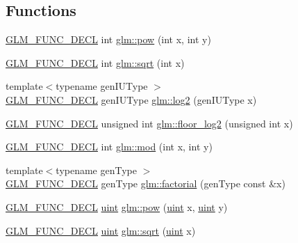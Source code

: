 \subsection*{Functions}
\begin{DoxyCompactItemize}
\item 
\hyperlink{setup_8hpp_ab2d052de21a70539923e9bcbf6e83a51}{G\+L\+M\+\_\+\+F\+U\+N\+C\+\_\+\+D\+E\+CL} int \hyperlink{group__gtx__integer_ga9642514a44a67afa70966d756f040ca9}{glm\+::pow} (int x, int y)
\item 
\hyperlink{setup_8hpp_ab2d052de21a70539923e9bcbf6e83a51}{G\+L\+M\+\_\+\+F\+U\+N\+C\+\_\+\+D\+E\+CL} int \hyperlink{group__gtx__integer_ga78e2e68330e91d350fcfc2f4831cad12}{glm\+::sqrt} (int x)
\item 
{\footnotesize template$<$typename gen\+I\+U\+Type $>$ }\\\hyperlink{setup_8hpp_ab2d052de21a70539923e9bcbf6e83a51}{G\+L\+M\+\_\+\+F\+U\+N\+C\+\_\+\+D\+E\+CL} gen\+I\+U\+Type \hyperlink{group__gtx__integer_ga9bd682e74bfacb005c735305207ec417}{glm\+::log2} (gen\+I\+U\+Type x)
\item 
\hyperlink{setup_8hpp_ab2d052de21a70539923e9bcbf6e83a51}{G\+L\+M\+\_\+\+F\+U\+N\+C\+\_\+\+D\+E\+CL} unsigned int \hyperlink{group__gtx__integer_ga7011b4e1c1e1ed492149b028feacc00e}{glm\+::floor\+\_\+log2} (unsigned int x)
\item 
\hyperlink{setup_8hpp_ab2d052de21a70539923e9bcbf6e83a51}{G\+L\+M\+\_\+\+F\+U\+N\+C\+\_\+\+D\+E\+CL} int \hyperlink{group__gtx__integer_gab9d22df91aac4d9eb925a4910f556f1b}{glm\+::mod} (int x, int y)
\item 
{\footnotesize template$<$typename gen\+Type $>$ }\\\hyperlink{setup_8hpp_ab2d052de21a70539923e9bcbf6e83a51}{G\+L\+M\+\_\+\+F\+U\+N\+C\+\_\+\+D\+E\+CL} gen\+Type \hyperlink{group__gtx__integer_ga8cbd3120905f398ec321b5d1836e08fb}{glm\+::factorial} (gen\+Type const \&x)
\item 
\hyperlink{setup_8hpp_ab2d052de21a70539923e9bcbf6e83a51}{G\+L\+M\+\_\+\+F\+U\+N\+C\+\_\+\+D\+E\+CL} \hyperlink{group__core__precision_ga4fd29415871152bfb5abd588334147c8}{uint} \hyperlink{group__gtx__integer_gaa8229e850c3cc4ad83492fe390ada044}{glm\+::pow} (\hyperlink{group__core__precision_ga4fd29415871152bfb5abd588334147c8}{uint} x, \hyperlink{group__core__precision_ga4fd29415871152bfb5abd588334147c8}{uint} y)
\item 
\hyperlink{setup_8hpp_ab2d052de21a70539923e9bcbf6e83a51}{G\+L\+M\+\_\+\+F\+U\+N\+C\+\_\+\+D\+E\+CL} \hyperlink{group__core__precision_ga4fd29415871152bfb5abd588334147c8}{uint} \hyperlink{group__gtx__integer_ga457e9efca8339bf918d319e9c55f7c8f}{glm\+::sqrt} (\hyperlink{group__core__precision_ga4fd29415871152bfb5abd588334147c8}{uint} x)

\end{DoxyCompactItemize}
